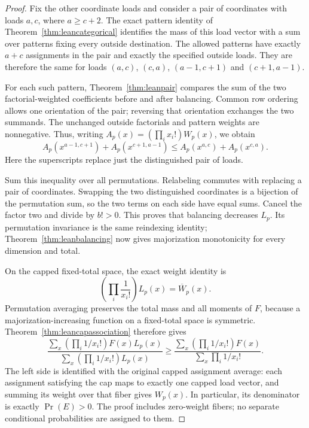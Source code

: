 \documentclass[11pt]{article}
\begin{document}
\begin{proof}
Fix the other coordinate loads and consider a pair of coordinates with
loads $a,c$, where $a\geq c+2$. The exact pattern identity of
Theorem~\ref{thm:leancategorical} identifies the mass of this load vector
with a sum over patterns fixing every outside destination. The allowed
patterns have exactly $a+c$ assignments in the pair and exactly the
specified outside loads. They are therefore the same for loads
$(a,c)$, $(c,a)$, $(a-1,c+1)$ and $(c+1,a-1)$.

For each such pattern, Theorem~\ref{thm:leanpair} compares the sum of the
two factorial-weighted coefficients before and after balancing. Common
row ordering allows one orientation of the pair; reversing that
orientation exchanges the two summands. The unchanged outside factorials
and pattern weights are nonnegative. Thus, writing
$A_p(x)=(\prod_i x_i!)W_p(x)$, we obtain
\[
 A_p(x^{a-1,c+1})+A_p(x^{c+1,a-1})
 \leq A_p(x^{a,c})+A_p(x^{c,a}).
\]
Here the superscripts replace just the distinguished pair of loads.

Sum this inequality over all permutations. Relabeling commutes with
replacing a pair of coordinates. Swapping the two distinguished
coordinates is a bijection of the permutation sum, so the two terms on
each side have equal sums. Cancel the factor two and divide by $b!>0$.
This proves that balancing decreases $L_p$. Its permutation invariance
is the same reindexing identity; Theorem~\ref{thm:leanbalancing} now gives
majorization monotonicity for every dimension and total.

On the capped fixed-total space, the exact weight identity is
\[
 \left(\prod_i\frac1{x_i!}\right)L_p(x)=\overline W_p(x).
\]
Permutation averaging preserves the total mass and all moments of $F$,
because a majorization-increasing function on a fixed-total space is
symmetric. Theorem~\ref{thm:leancapassociation} therefore gives
\[
 \frac{\sum_x (\prod_i1/x_i!)F(x)L_p(x)}
      {\sum_x (\prod_i1/x_i!)L_p(x)}
 \geq
 \frac{\sum_x (\prod_i1/x_i!)F(x)}{\sum_x\prod_i1/x_i!}.
\]
The left side is identified with the original capped assignment average:
each assignment satisfying the cap maps to exactly one capped load
vector, and summing its weight over that fiber gives $W_p(x)$. In
particular, its denominator is exactly $\Pr(E)>0$. The proof includes
zero-weight fibers; no separate conditional probabilities are assigned
to them.


\end{proof}
\end{document}
